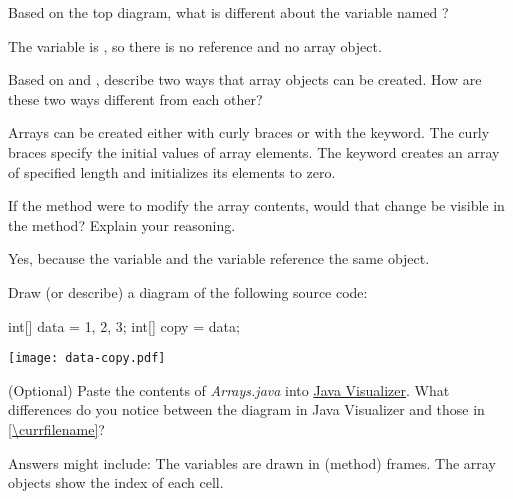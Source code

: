 \Q Based on the top diagram, what is different about the variable named ?

\begin{answer}[3em]
The variable is , so there is no reference and no array object.
\end{answer}


\Q \label{key1}
Based on  and , describe two ways that array objects can be created.
How are these two ways different from each other?

\begin{answer}[5em]
Arrays can be created either with curly braces or with the  keyword.
The curly braces specify the initial values of array elements.
The  keyword creates an array of specified length and initializes its elements to zero.
\end{answer}


\Q If the  method were to modify the array contents, would that change be visible in the  method?
Explain your reasoning.

\begin{answer}[3em]
Yes, because the variable  and the variable  reference the same object.
\end{answer}


\Q Draw (or describe) a diagram of the following source code:

\begin{javalst}
int[] data = {1, 2, 3};
int[] copy = data;
\end{javalst}

\begin{answer}[15em]
\texttt{[image: data-copy.pdf]}
\end{answer}


\Q (Optional) Paste the contents of \textit{Arrays.java} into \href{https://cscircles.cemc.uwaterloo.ca/java_visualize/#code=public+class+ClassNameHere+%7B%0A++++public+static+void+main(String%5B%5D+args)+%7B%0A++++++++%0A++++%7D%0A%7D&mode=edit&showStringsAsObjects=1}{Java Visualizer}.
What differences do you notice between the diagram in Java Visualizer and those in \ref{\currfilename}?

\begin{answer}
Answers might include:
\bull The variables are drawn in (method) frames.
\bull The array objects show the index of each cell.
\end{answer}
